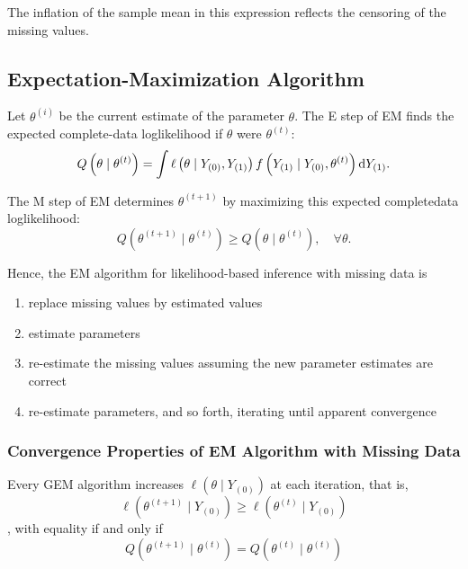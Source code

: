 \begin{example}
	The inflation of the sample mean in this expression reflects the censoring of the missing values.
\end{example}

\subsection{Expectation-Maximization Algorithm}

Let $\theta^{(i)}$ be the current estimate of the parameter $\theta$. The E step of EM finds the expected complete-data loglikelihood if $\theta$ were $\theta^{(t)}$:
\begin{equation}
	Q\left(\theta \mid \theta^{(t)}\right)=\int\ell\left(\theta \mid Y_{(0)}, Y_{(1)}\right) f\left(Y_{(1)} \mid Y_{(0)}, \theta^{(t)}\right) \mathop{}\!\mathrm{d} Y_{(1)}.
\end{equation}

The M step of EM determines $\theta^{(t+1)}$ by maximizing this expected completedata loglikelihood:
\begin{equation}
	Q\left(\theta^{(t+1)} \mid \theta^{(t)}\right) \geq Q\left(\theta \mid \theta^{(t)}\right), \quad \forall\theta.
\end{equation}

Hence, the EM algorithm for likelihood-based inference with missing data is
\begin{enumerate}
	\item replace missing values by estimated
	      values
	\item estimate parameters
	\item re-estimate the missing values assuming the new parameter estimates are correct
	\item re-estimate parameters, and so forth, iterating until apparent convergence
\end{enumerate}

\subsubsection{Convergence Properties of EM Algorithm with Missing Data}

\begin{theorem}
	Every GEM algorithm increases $\ell\left(\theta \mid Y_{(0)}\right)$ at each iteration, that is,
	\begin{equation}
		\ell\left(\theta^{(t+1)} \mid Y_{(0)}\right) \geq \ell\left(\theta^{(t)} \mid Y_{(0)}\right)
	\end{equation}
	, with equality if and only if
	\begin{equation}
		Q\left(\theta^{(t+1)} \mid \theta^{(t)}\right)=Q\left(\theta^{(t)} \mid \theta^{(t)}\right)
	\end{equation}
\end{theorem}

